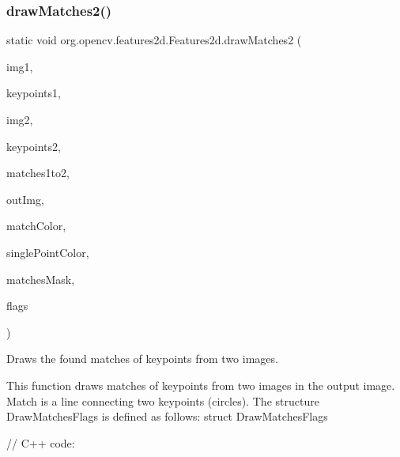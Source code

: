 \subsubsection{\texorpdfstring{draw\+Matches2()}{drawMatches2()}\hspace{0.1cm}{\footnotesize\ttfamily [1/2]}}
{\footnotesize\ttfamily static void org.\+opencv.\+features2d.\+Features2d.\+draw\+Matches2 (\begin{DoxyParamCaption}\item[{\mbox{\hyperlink{classorg_1_1opencv_1_1core_1_1_mat}{Mat}}}]{img1,  }\item[{\mbox{\hyperlink{classorg_1_1opencv_1_1core_1_1_mat_of_key_point}{Mat\+Of\+Key\+Point}}}]{keypoints1,  }\item[{\mbox{\hyperlink{classorg_1_1opencv_1_1core_1_1_mat}{Mat}}}]{img2,  }\item[{\mbox{\hyperlink{classorg_1_1opencv_1_1core_1_1_mat_of_key_point}{Mat\+Of\+Key\+Point}}}]{keypoints2,  }\item[{List$<$ \mbox{\hyperlink{classorg_1_1opencv_1_1core_1_1_mat_of_d_match}{Mat\+Of\+D\+Match}} $>$}]{matches1to2,  }\item[{\mbox{\hyperlink{classorg_1_1opencv_1_1core_1_1_mat}{Mat}}}]{out\+Img,  }\item[{\mbox{\hyperlink{classorg_1_1opencv_1_1core_1_1_scalar}{Scalar}}}]{match\+Color,  }\item[{\mbox{\hyperlink{classorg_1_1opencv_1_1core_1_1_scalar}{Scalar}}}]{single\+Point\+Color,  }\item[{List$<$ \mbox{\hyperlink{classorg_1_1opencv_1_1core_1_1_mat_of_byte}{Mat\+Of\+Byte}} $>$}]{matches\+Mask,  }\item[{int}]{flags }\end{DoxyParamCaption})\hspace{0.3cm}{\ttfamily [static]}}

Draws the found matches of keypoints from two images.

This function draws matches of keypoints from two images in the output image. Match is a line connecting two keypoints (circles). The structure {\ttfamily Draw\+Matches\+Flags} is defined as follows\+: struct Draw\+Matches\+Flags {\ttfamily }

{\ttfamily }

{\ttfamily }

{\ttfamily // C++ code\+:}

{\ttfamily }

{\ttfamily }

